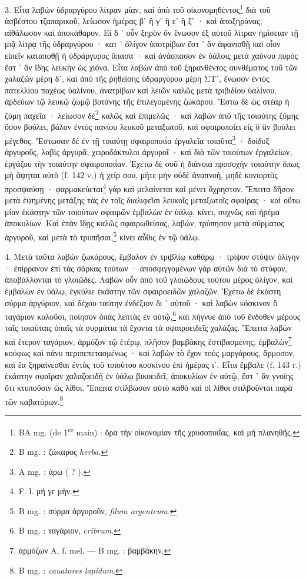 \documentclass[a4paper, 11pt, oneside, polutonikogreek, french]{article}
\begin{document}
3. Εἶτα λαβὼν ὑδραργύρου λίτραν μίαν, καὶ ἀπὸ τοῦ οἰκονομηθέντος\footnote{BA mg. (de 1\textsuperscript{re} main) : ὅρα τὴν οἰκονομίαν τῆς χρυσοποιΐας, καὶ μὴ πλανηθῆς.} διὰ τοῦ ἀσβέστου τζαπαρικοῦ, λείωσον ἡμέρας βʹ ἢ γʹ ἢ εʹ ἢ ζʹ · καὶ ἀποξηράνας, αἰθάλωσον καὶ ἀποκάθαρον. Εἰ δ ᾽ οὖν ξηρὸν ὂν ἕνωσον ἐξ αὐτοῦ λίτραν ἡμίσειαν τῇ μιᾷ λίτρᾳ τῆς ὑδραργύρου · κατ ᾽ ὀλίγον ὑποτρίβων ἔστ ᾽ ἂν ἀφανισθῇ καὶ οἷον εἰπεῖν καταποθῇ ἡ ὑδράργυρος ἅπασα · καὶ ἀνάσπασον ἐν ὑάλοις μετὰ χαύνου πυρὸς ἔστ ᾽ ἂν ἴδῃς λευκὴν ὡς χιόνα. Εἶτα λαβὼν ἀπὸ τοῦ ξηρανθέντος συνθέματος τοῦ τῶν χαλαζῶν μέρη δʹ, καὶ ἀπὸ τῆς ῥηθείσης ὑδραργύρου μέρη ΣΤʹ, ἕνωσον ἐντὸς πατελλίου παχέως ὑαλίνου, ἀνατρίβων καὶ λειῶν καλῶς μετὰ τριβιδίου ὑαλίνου, ἀρδεύων τῷ λευκῷ ζωμῷ βοτάνης τῆς ἐπιλεγομένης ζωκάρου. Ἔστω δὲ ὡς στέαρ ἡ ζύμη παχεῖα · λείωσον δὲ\footnote{B mg. : ζώκαρος \emph{herba}.} καλῶς καὶ ἐπιμελῶς · καὶ λαβὼν ἀπὸ τῆς τοιαύτης ζύμης ὅσον βούλει, βάλον ἐντὸς πανίου λευκοῦ μεταξωτοῦ, καὶ σφαιροποίει εἰς ὃ ἂν βούλει μέγεθος. Ἔστωσαν δὲ ἐν τῇ τοιαύτῃ σφαιροποιΐα ἐργαλεῖα τοιαῦτα\footnote{A mg. : ἀρω ( ? ).} · δοίδυξ ἀργυροῦς, λαβὶς ἀργυρᾶ, χειροδάκτυλοι ἀργυροῖ · καὶ διὰ τῶν τοιούτων ἐργαλείων, ἐργάζου τὴν τοιαύτην σφαιροποιΐαν. Ἐχέτω δὲ σοῦ ἡ διάνοια προσοχὴν τοιαύτην ὅπως μὴ ἅψηται αὐτὸ (f. 142 v.) ἡ χείρ σου, μήτε μὴν οὐδὲ ἀναπνοὴ, μηδὲ κονιορτὸς προσψαύσῃ · φαρμακεύεται\footnote{F. l. μή γε μὴν.} γὰρ καὶ μελαίνεται καὶ μένει ἄχρηστον. Ἔπειτα δῆσον μετὰ ἑψημένης μετάξης τὰς ἐν τοῖς διαλιφεῖσι λευκοῖς μεταξωτοῖς σφαίρας · καὶ οὕτω μίαν ἑκάστην τῶν τοιούτων σφαιρῶν ἐμβαλὼν ἐν ὑάλῳ, κίνει, συχνῶς καὶ ἠρέμα ἀποκυλίων. Καὶ ἐπὰν ἴδῃς καλῶς σφαιρωθείσας, λαβὼν, τρύπησον μετὰ σύρματος ἀργυροῦ, καὶ μετὰ τὸ τρυπῆσαι,\footnote{B mg. : σύρμα ἀργυροῦν, \emph{filum argenteum}.} κίνει αὖθις ἐν τῷ ὑάλῳ.

4. Μετὰ ταῦτα λαβὼν ζωκάρους, ἔμβαλον ἐν τριβλίῳ καθάρῳ · τρίψον στύψιν ὀλίγην · ἐπίρρανον ἐπὶ τὰς σάρκας τούτων · ἀποσφιγγομένων γὰρ αὐτῶν διὰ τὸ στύφον, ἀποβάλλονται τὸ γλοιῶδες. Λαβὼν οὖν ἀπὸ τοῦ γλοιώδους τούτου μέρος ὀλίγον, καὶ ἐμβαλὼν ἐν ὑάλῳ, ἐγκύλιε ἑκάστην τῶν σφαιροειδῶν χαλαζῶν. Ἐχέτω δὲ ἑκάστη σύρμα ἀργύριον, καὶ δέχου ταύτην ἐνδέξιον δι ᾽ αὐτοῦ · καὶ λαβὼν κόσκινον ὃ ταγάριον καλοῦσι, ποίησον ὀπὰς λεπτὰς ἐν αὐτῷ,\footnote{B mg. : ταγάριον, \emph{cribrum}.} καὶ πήγνυε ἀπὸ τοῦ ἔνδοθεν μέρους ταῖς τοιαύταις ὀπαῖς τὰ συρμάτια τὰ ἔχοντα τὰ σφαιροειδεῖς χαλάζας. Ἔπειτα λαβὼν καὶ ἕτερον ταγάριον, ἁρμόζον τῷ ἑτέρῳ, πλῆσον βαμβάκης ἐστιβασμένης, ἐμβαλὼν\footnote{ἁρμόζων A, f. mel. --- B mg. : βαμβάκην.} κούφως καὶ πάνυ περιπεπετασμένως · καὶ λαβὼν τὸ ἔχον τοὺς μαργάρους, ἅρμοσον, καὶ ἔα ξηραίνεσθαι ἐντὸς τοῦ τοιούτου κοσκίνου ἐπὶ ἡμέρας ιʹ. Εἶτα ἔμβαλε (f. 143 r.) ἑκάστην σφαῖραν χαλαζοειδῆ ἐν ὑάλῳ βικοειδεῖ, ἀποκυλίων ἐν αὐτῷ, ἔστ ᾽ ἂν γνοίης ὅτι κτυποῦσιν ὡς λίθοι. Ἔπειτα στίλβωσον αὐτὸ καθὸ καὶ οἱ λίθοι στιλβοῦνται παρὰ τῶν καβατόρων.\footnote{B mg. : \emph{cauatores lapidum}.}
\end{document}
